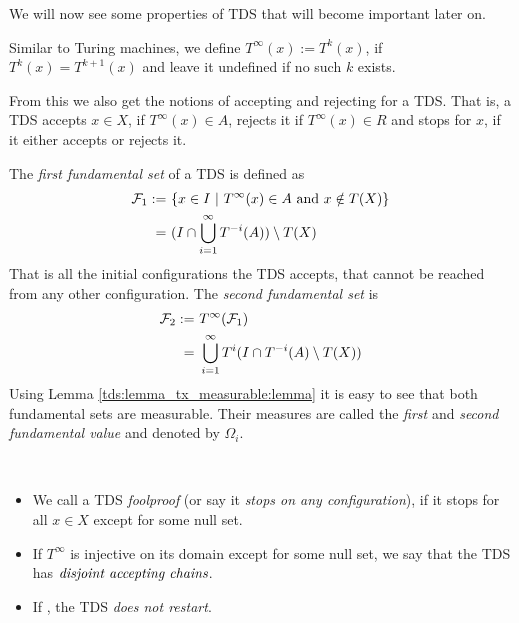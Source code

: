 We will now see some properties of TDS that will become important later on.

Similar to Turing machines, we define $T^\infty(x):=T^k(x)$, if $T^k(x)=T^{k+1}(x)$ and leave it undefined if no such $k$ exists.

From this we also get the notions of accepting and rejecting for a TDS.
That is, a TDS accepts $x \in X$, if $T^\infty(x) \in A$,
rejects it if $T^\infty(x) \in R$ 
and stops for $x$, if it either accepts or rejects it.

\begin{Definition}
	The \emph{first fundamental set} of a TDS is defined as
	\begin{align*}
		\mathcal{F}_1 :=&~\{ x \in I~|~T^\infty(x) \in A~\text{and}~x \notin T(X) \} \\
		=&~(I \cap \bigcup_{i=1}^\infty T^{-i}(A)) \setminus T(X)
	\end{align*}
	That is all the initial configurations the TDS accepts, that cannot be reached from any other configuration.
	The \emph{second fundamental set} is
	\begin{align*}
		\mathcal{F}_2 :=&~T^\infty(\mathcal{F}_1) \\
		=&~\bigcup_{i=1}^\infty T^i( I \cap T^{-i}(A) \setminus T(X))
	\end{align*}
	Using Lemma \ref{tds:lemma_tx_measurable:lemma} it is easy to see that both fundamental sets are measurable.
	Their measures are called the \emph{first} and \emph{second fundamental value} and denoted by $\Omega_i$.
\end{Definition}


\begin{Definition}
	\
	\begin{itemize}
		\item We call a TDS \emph{foolproof} (or say it \emph{stops on any configuration}), if it stops for all $x \in X$ except for some null set.

		\item If $T^\infty$ is injective on its domain except for some null set, we say that the TDS has $\emph{disjoint accepting chains}$.

		\item If , the TDS \emph{does not restart}.
	\end{itemize}
\end{Definition}
